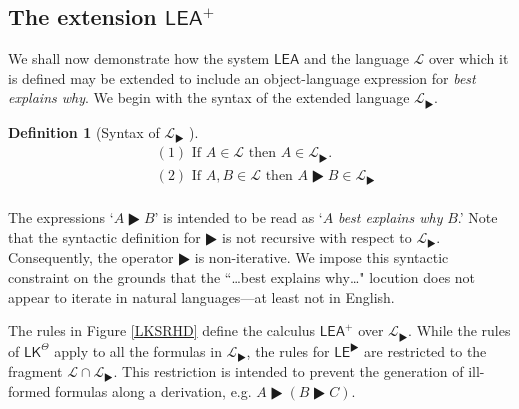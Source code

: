 \documentclass{article}
\theoremstyle{definition}
\theoremstyle{definition}
\theoremstyle{definition}
\theoremstyle{definition}
\newtheorem{definition}{Definition}
\theoremstyle{remark}
\theoremstyle{definition}
\theoremstyle{definition}
\begin{document}
\subsection{The extension $ \mathsf{LEA^+}$}


We shall now demonstrate how the system $ \mathsf{LEA}$ and the language $ \mathcal{L} $ over which it is defined may be extended to include an object-language expression for \textit{best explains why}. We begin with the syntax of the extended language $ \mathcal{L}_\RHD $.

\begin{definition}[Syntax of $ \mathcal{L}_\RHD $ ]
\begin{equation}\nonumber
\begin{split}
	& (1)\,\, \text{If}\,\,  A \in \mathcal{L}  \,\,\text{then}\,\,  A \in \mathcal{L}_\RHD .\\
 & (2) \,\,\text{If}\,\,  A, B \in \mathcal{L} \,\,\text{then}\,\, A \RHD B \in \mathcal{L}_\RHD\\
\end{split}
\end{equation}
\end{definition}

The expressions `$A \RHD B$' is intended to be read as `$ A $ \textit{best explains why} $ B$.' Note that the syntactic definition for $ \RHD $ is not recursive with respect to $ \mathcal{L}_\RHD $. Consequently, the operator $ \RHD $ is non-iterative.  We impose this syntactic constraint on the grounds that the ``\dots best explains why\ldots" locution does not appear to iterate in natural languages---at least not in English. 

The rules in Figure \ref{LKSRHD} define the calculus $ \mathsf{LEA^+}$ over $ \mathcal{L}_\RHD $. While the rules of $ \mathsf{LK}^\Theta $ apply to all the formulas in $ \mathcal{L}_\RHD $, the rules for $ \mathsf{LE}^\RHD $ are restricted to the fragment $ \mathcal{L}\cap\mathcal{L}_\RHD $. This restriction is intended to prevent the generation of ill-formed formulas along a derivation, e.g. $ A \RHD (B \RHD C) $. 
\end{document}
